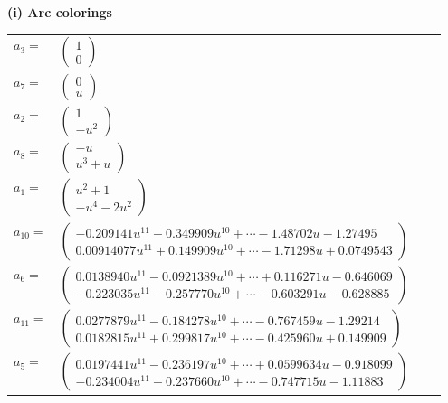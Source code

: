 \documentclass[1p]{elsarticle_modified}
\theoremstyle{definition}
\begin{document}
\flushleft \textbf{(i) Arc colorings}\\
\begin{tabular}{m{7pt} m{180pt} m{7pt} m{180pt} }
\flushright $a_{3}=$&$\begin{pmatrix}1\\0\end{pmatrix}$ \\
\flushright $a_{7}=$&$\begin{pmatrix}0\\u\end{pmatrix}$ \\
\flushright $a_{2}=$&$\begin{pmatrix}1\\- u^2\end{pmatrix}$ \\
\flushright $a_{8}=$&$\begin{pmatrix}- u\\u^3+u\end{pmatrix}$ \\
\flushright $a_{1}=$&$\begin{pmatrix}u^2+1\\- u^4-2 u^2\end{pmatrix}$ \\
\flushright $a_{10}=$&$\begin{pmatrix}-0.209141 u^{11}-0.349909 u^{10}+\cdots-1.48702 u-1.27495\\0.00914077 u^{11}+0.149909 u^{10}+\cdots-1.71298 u+0.0749543\end{pmatrix}$ \\
\flushright $a_{6}=$&$\begin{pmatrix}0.0138940 u^{11}-0.0921389 u^{10}+\cdots+0.116271 u-0.646069\\-0.223035 u^{11}-0.257770 u^{10}+\cdots-0.603291 u-0.628885\end{pmatrix}$ \\
\flushright $a_{11}=$&$\begin{pmatrix}0.0277879 u^{11}-0.184278 u^{10}+\cdots-0.767459 u-1.29214\\0.0182815 u^{11}+0.299817 u^{10}+\cdots-0.425960 u+0.149909\end{pmatrix}$ \\
\flushright $a_{5}=$&$\begin{pmatrix}0.0197441 u^{11}-0.236197 u^{10}+\cdots+0.0599634 u-0.918099\\-0.234004 u^{11}-0.237660 u^{10}+\cdots-0.747715 u-1.11883\end{pmatrix}$ \\

\end{tabular}
\end{document}
